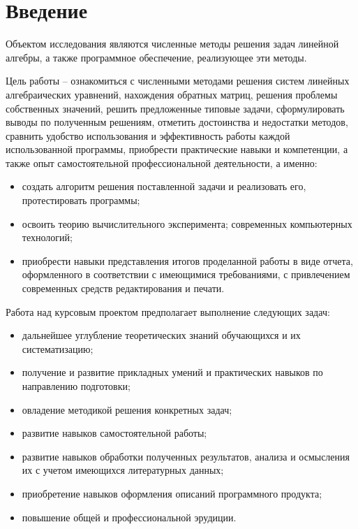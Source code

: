\documentclass[14pt, a4paper]{extarticle}
\begin{document}
	
	\pagebreak
	
	\pagebreak
	
	\section{Введение}
	
	Объектом исследования являются численные методы решения задач линейной алгебры, а также программное обеспечение, реализующее эти методы.
	
	Цель работы – ознакомиться с численными методами решения систем линейных алгебраических уравнений, нахождения обратных матриц, решения проблемы собственных значений, решить предложенные типовые задачи, сформулировать выводы по полученным решениям, отметить достоинства и недостатки методов, сравнить удобство использования и эффективность работы каждой использованной программы, приобрести практические навыки и компетенции, а также опыт самостоятельной профессиональной деятельности, а именно:
	
	\begin{itemize}
		\item создать алгоритм решения поставленной задачи и реализовать его, протестировать программы;
		
		\item освоить теорию вычислительного эксперимента; современных компьютерных технологий;
		
		\item приобрести навыки представления итогов проделанной работы в виде отчета, оформленного в соответствии с имеющимися требованиями, с привлечением современных средств редактирования и печати.
		
	\end{itemize}

	Работа над курсовым проектом предполагает выполнение следующих задач:
	
	\begin{itemize}
		\item дальнейшее углубление теоретических знаний обучающихся и их систематизацию;
		
		\item получение и развитие прикладных умений и практических навыков по направлению подготовки;
		
		\item овладение методикой решения конкретных задач;
		
		\item развитие навыков самостоятельной работы;
		
		\item развитие навыков обработки полученных результатов, анализа и осмысления их с учетом имеющихся литературных данных;
		
		\item приобретение навыков оформления описаний программного продукта;
		
		\item повышение общей и профессиональной эрудиции.
		
	\end{itemize}
\end{document}
